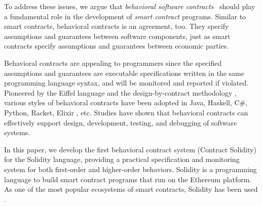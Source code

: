 To address these issues, we argue that \emph{behavioral software
contracts}~\cite{DBLP:conf/tools/Meyer98a} should play a fundamental role in
the development of \emph{smart contract} programs.
Similar to smart contracts, behavioral contracts is an agreement, too. They
specify assumptions and guarantees between software components, just as
smart contracts specify assumptions and guarantees between economic parties.

Behavioral contracts are appealing to programmers since the specified
assumptions and guarantees are executable specifications written in the same
programming language syntax, and will be monitored and reported if violated.
Pioneered by the Eiffel language \cite{DBLP:books/ph/Meyer91} and the
design-by-contract methodology \cite{DBLP:conf/tools/Meyer98a,
DBLP:books/ph/Meyer97}, various styles of behavioral contracts have been
adopted in Java, Haskell, C\#, Python, Racket, Elixir
\cite{DBLP:conf/erlang/0001BBHMEF22}, etc. 
Studies \cite{DBLP:conf/rodin/Chalin06, DBLP:books/ph/Meyer97}
have shown that behavioral contracts can effectively support design, development,
testing, and debugging of software systems.

In this paper, we develop the first behavioral contract system \lang (Contract
Solidity) for the Solidity language, providing a practical specification and
monitoring system for both first-order and higher-order behaviors.
Solidity is a programming language to build smart contract programs that run on
the Ethereum platform.  As one of the most popular ecosystems of smart
contracts, Solidity has been used .



